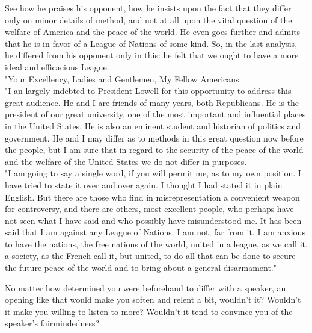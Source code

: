 \documentclass[10pt]{article}
\begin{document}
See how he praises his opponent, how he insists upon the fact that they differ only on minor details of method, and not at all upon the vital question of the welfare of America and the peace of the world. He even goes further and admits that he is in favor of a League of Nations of some kind. So, in the last analysis, he differed from his opponent only in this: he felt that we ought to have a more ideal and efficacious League.\\
"Your Excellency, Ladies and Gentlemen, My Fellow Americans:\\
"I an largely indebted to President Lowell for this opportunity to address this great audience. He and I are friends of many years, both Republicans. He is the president of our great university, one of the most important and influential places in the United States. He is also an eminent student and historian of politics and government. He and I may differ as to methods in this great question now before the people, but I am sure that in regard to the security of the peace of the world and the welfare of the United States we do not differ in purposes.\\
"I am going to say a single word, if you will permit me, as to my own position. I have tried to state it over and over again. I thought I had stated it in plain English. But there are those who find in misrepresentation a convenient weapon for controversy, and there are others, most excellent people, who perhaps have not seen what I have said and who possibly have misunderstood me. It has been said that I am against any League of Nations. I am not; far from it. I am anxious to have the nations, the free nations of the world, united in a league, as we call it, a society, as the French call it, but united, to do all that can be done to secure the future peace of the world and to bring about a general disarmament."

No matter how determined you were beforehand to differ with a speaker, an opening like that would make you soften and relent a bit, wouldn't it? Wouldn't it make you willing to listen to more? Wouldn't it tend to convince you of the speaker's fairmindedness?
\end{document}
